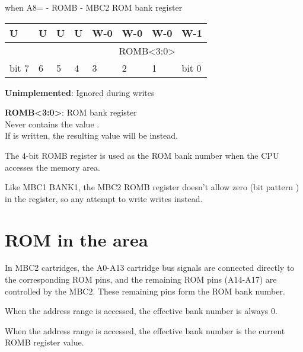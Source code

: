 \documentclass[\main/gbctr.tex]{subfiles}
\begin{document}
\begin{register}[H]
  \caption{ when A8= - ROMB - MBC2 ROM bank register}
  {
    \ttfamily
    \begin{tabularx}{\linewidth}{|X|X|X|X|X|X|X|X|}
      \hline
      U & U & U & U & W-0 & W-0 & W-0 & W-1 \\
      \hline
      \cellcolor{LightGray} & \cellcolor{LightGray} & \cellcolor{LightGray} & \cellcolor{LightGray} & \multicolumn{4}{c|}{ROMB<3:0>} \\
      \hline
      bit 7 & 6 & 5 & 4 & 3 & 2 & 1 & bit 0 \\
      \hline
    \end{tabularx}{\parfillskip=0pt\par}
  }

  \begin{description}[leftmargin=5em, style=nextline]
    \item[bit 7-4]
      \textbf{Unimplemented}: Ignored during writes
    \item[bit 3-0]
      \textbf{ROMB<3:0>}: ROM bank register\\
      Never contains the value .\\
      If  is written, the resulting value will be  instead.
  \end{description}
\end{register}

The 4-bit ROMB register is used as the ROM bank number when the CPU accesses
the  memory area.

Like MBC1 BANK1, the MBC2 ROMB register doesn't allow zero (bit pattern
) in the register, so any attempt to write  writes
 instead.

\section{ROM in the  area}

In MBC2 cartridges, the A0-A13 cartridge bus signals are connected directly to
the corresponding ROM pins, and the remaining ROM pins (A14-A17) are controlled
by the MBC2. These remaining pins form the ROM bank number.

When the  address range is accessed, the effective bank
number is always 0.

When the  address range is accessed, the effective bank
number is the current ROMB register value.
\end{document}
